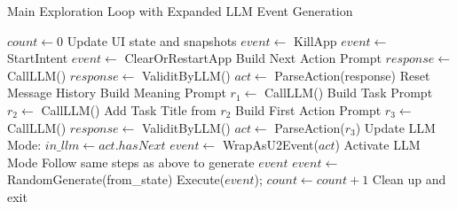 \documentclass{article}
\begin{document}
\begin{algorithm}
\caption{Main Exploration Loop with Expanded LLM Event Generation}
\begin{algorithmic}[1]
  \State $count \gets 0$
    \State Update UI state and snapshots
      \State $event \gets$ KillApp
      \State $event \gets$ StartIntent
      \State $event \gets$ ClearOrRestartApp
    \Else
          \State Build Next Action Prompt
          \State $response \gets$ CallLLM()
          \State $response \gets$ ValiditByLLM()
          \State $act \gets$ ParseAction(response)
        \Else
          \State Reset Message History
          \State Build Meaning Prompt
          \State $r_1 \gets$ CallLLM()
          \State Build Task Prompt
          \State $r_2 \gets$ CallLLM()
          \State Add Task Title from $r_2$
          \State Build First Action Prompt
          \State $r_3 \gets$ CallLLM()
          \State $response \gets$ ValiditByLLM()
          \State $act \gets$ ParseAction($r_3$)
        \EndIf
        \State Update LLM Mode: $in\_llm \gets act.hasNext$
        \State $event \gets$ WrapAsU2Event($act$)
        \State Activate LLM Mode
        \State Follow same steps as above to generate $event$
      \Else
        \State $event \gets$ RandomGenerate(from\_state)
      \EndIf
    \EndIf
    \State Execute($event$); $count \gets count + 1$
  \EndWhile
  \State Clean up and exit
\EndProcedure
\end{algorithmic}
\end{algorithm}
\end{document}
